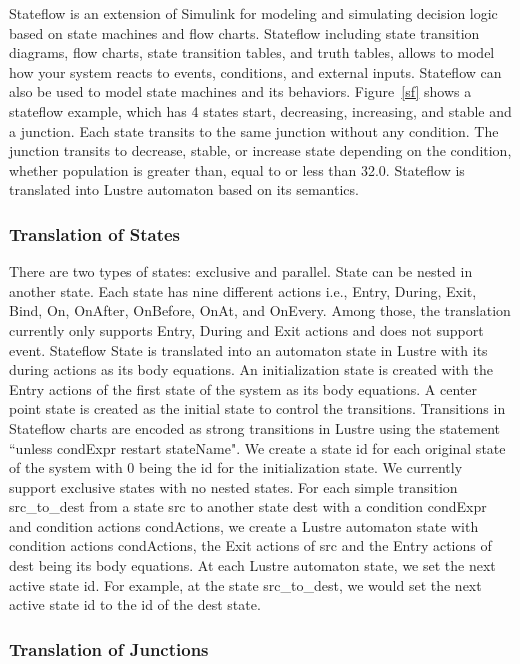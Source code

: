 \documentclass{article}
\begin{document}
Stateflow is an extension of Simulink for modeling and simulating decision logic based on state machines and flow charts. 
Stateflow including state transition diagrams, flow charts, state transition tables, and truth tables, allows to model how your system reacts to events, conditions, and external inputs.
Stateflow can also be used to model state machines and its behaviors. 
Figure~\ref{sf} shows a stateflow example, which has 4 states start, decreasing, increasing, and stable and a junction. 
Each state transits to the same junction without any condition. 
The junction transits to decrease, stable, or increase state depending on the condition, whether \textsf{population} is greater than, equal to or less than 32.0. 
Stateflow is translated into Lustre automaton based on its semantics. 

\subsubsection{Translation of States}
There are two types of states: exclusive and parallel. 
State can be nested in another state.
Each state has nine different actions i.e., Entry, During, Exit, Bind, On, OnAfter, OnBefore, OnAt, and OnEvery. 
Among those, the translation currently only supports Entry, During and Exit actions and does not support event. 
Stateflow State is translated into an automaton state in Lustre with its during actions as its body equations.
An initialization state is created with the Entry actions of the first state of the system as its body equations. 
A center point state is created as the initial state to control the transitions. 
Transitions in Stateflow charts are encoded as strong transitions in Lustre using the statement ``\textsf{unless} condExpr \textsf{restart} stateName".
We create a state id for each original state of the system with 0 being the id for the initialization state.
We currently support exclusive states with no nested states.
For each simple transition \textsf{src\_to\_dest} from a state \textsf{src} to another state \textsf{dest} with a condition \textsf{condExpr} and condition actions \textsf{condActions}, we create a Lustre automaton state with condition actions \textsf{condActions}, the Exit actions of \textsf{src} and the Entry actions of \textsf{dest} being its body equations.
At each Lustre automaton state, we set the next active state id.
For example, at the state \textsf{src\_to\_dest}, we would set the next active state id to the id of the \textsf{dest} state.

\subsubsection{Translation of Junctions}
\end{document}
